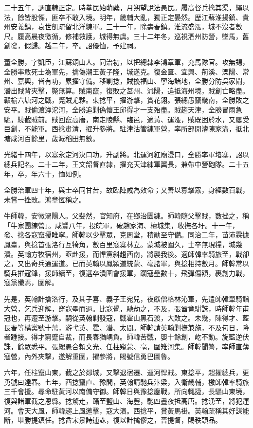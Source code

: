 \begin{pinyinscope}
二十五年，調直隸正定。時拳民始萌蘗，月朔望說法愚民。履高督兵擒其渠，繩以法，餘皆股慄，匪卒不敢入境。明年，畿輔大亂，獨正定晏然。歷江蘇淮揚鎮、貴州安義鎮，袁世凱疏留北洋練軍。三十一年，除壽春鎮。淮流盛漲，城不沒者數尺。履高晨夜徼循，修補救護，城得無虞。三十二年冬，巡視泗州防營，墜馬，舊創發，假歸。越二年，卒。詔優恤，予建祠。

董全勝，字凱臣，江蘇銅山人。同治初，以把總隸李鴻章軍，充馬隊官。攻無錫，全勝率敢死士為軍先，擒偽潮王黃子隆，城遂克。復金匱、宜興、荊溪、溧陽、常州、嘉興，皆有功，累擢守備。移剿捻，賊擾福山、寧海諸地，全勝分防吳家閘，潛出賊背夾擊，斃無算。賊南竄，復敗之莒州、沭陽，追抵海州境，賊創亡略盡。贛榆六塘河之戰，斃賊尤夥。東捻平，擢游擊，賞花翎。張總愚竄畿南，全勝敗之安平。賊偷渡滹沱河，全勝追剿偽懷王邱得才一支殆盡。賊趨天津，全勝冒雨急馳，繞截賊前。賊回竄高唐，南走陵縣、臨邑，適黃、運漲，賊既困於水，又屢受巨創，不能軍。西捻肅清，擢升參將。駐津沽管練軍營，率所部開濬陳家溝，抵北塘咸河百餘里，歲溉稻田無數。

光緒十四年，以塞永定河決口功，升副將。北運河紅廟漫口，全勝率軍堵塞，詔以總兵記名。二十二年，王文韶督直隸，擢充天津練軍翼長，兼帶中營砲隊。二十五年，卒，年六十，恤如例。

全勝治軍四十年，與士卒同甘苦，故臨陣咸為效命；又善以寡擊眾，身經數百戰，未嘗一挫敗。鴻章恆稱之。

牛師韓，安徽渦陽人。父斐然，官知府，在鄉治團練。師韓隨父擊賊，數挫之，稱「牛家團練營」。咸豐八年，投皖軍，破趙家海、檀城集，收撫各圩。十一年，發、捻各寇竄擾睢寧。師韓以少擊眾，克周堂，積勛至守備。同治二年，苗沛霖據鳳臺，與捻首張洛行互犄角，數百里寇寨林立。蒙城被圍久，士卒無現糧，城幾潰。英翰方牧宿州，亟赴援，而悍黨斜趨西南，將襲我後。適師韓率騎旅至，戰卻之，又出奇兵通運道。已而英翰以鳳潁道統蒙、亳諸軍，與捻相持數月。師韓常以騎兵摧寇鋒，援師續至，復選卒潰圍會援軍，躪寇壘數十，飛彈傷額，裹創力戰，寇黨殲焉，圍解。

先是，英翰計擒洛行，及其子喜、義子王宛兒，夜獻僧格林沁軍，先遣師韓單騎詣大營，乞兵迎解，穿寇壘而過。比寇覺，馳劫之，不及，張酋竟駢誅，時師韓年甫冠也，再遷至游擊。嗣從英翰剿發寇，戰霍山黑石渡，大敗之。未幾，陳得才、藍長春等構黨號十萬，游弋英、霍、潛、太間。師韓請英翰剿撫兼施，不及旬日，降者踵接。得才窮蹙自裁，而長春猶嵎負。師韓苦戰，嬰十餘創，屹不動。旋藍逆伏誅，餘眾悉平。張總愚合賴文光、任柱窺蒙、亳，圍雉河集。師韓聞警，率師直薄寇營，內外夾擊，遂解重圍，擢參將，賜號信勇巴圖魯。

六年，任柱竄山東，截之於郯城，又擊退宿遷、運河悍賊。東捻平，超擢總兵，更勇號曰達春。七年，西捻竄直、豫間，英翰請馳兵汴梁，入衛畿輔，檄師韓率騎旅三千會援。尋命駐黃河以南備守御。師韓日與豫捻鏖戰，所向輒捷，長驅山東境，復與諸軍截之恩縣。捻驚走，躡至鹽山、海豐，馳四晝夜抵高唐。捻湧至，將犯運河。會天大風，師韓趨上風邀擊，寇大潰。西捻平，賞黃馬褂。英翰疏稱其好謀能斷，堪勝提鎮任。捻酋宋景詩逋誅，復以計擒僇之，晉提督，賜秩頭品。


\end{pinyinscope}
